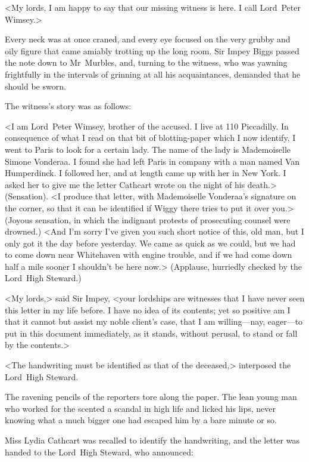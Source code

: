 <My lords, I am happy to say that our missing witness is here. I call Lord~Peter Wimsey.>

Every neck was at once craned, and every eye focused on the very grubby and oily figure that came amiably trotting up the long room. Sir Impey Biggs passed the note down to Mr~Murbles, and, turning to the witness, who was yawning frightfully in the intervals of grinning at all his acquaintances, demanded that he should be sworn.

The witness's story was as follows:

<I am Lord~Peter Wimsey, brother of the accused. I live at 110 Piccadilly. In consequence of what I read on that bit of blotting-paper which I now identify, I went to Paris to look for a certain lady. The name of the lady is Mademoiselle Simone Vonderaa. I found she had left Paris in company with a man named Van Humperdinck. I followed her, and at length came up with her in New York. I asked her to give me the letter Cathcart wrote on the night of his death.> (Sensation). <I produce that letter, with Mademoiselle Vonderaa's signature on the corner, so that it can be identified if Wiggy there tries to put it over you.> (Joyous sensation, in which the indignant protests of prosecuting counsel were drowned.) <And I'm sorry I've given you such short notice of this, old man, but I only got it the day before yesterday. We came as quick as we could, but we had to come down near Whitehaven with engine trouble, and if we had come down half a mile sooner I shouldn't be here now.> (Applause, hurriedly checked by the Lord~High Steward.)

<My lords,> said Sir Impey, <your lordships are witnesses that I have never seen this letter in my life before. I have no idea of its contents; yet so positive am I that it cannot but assist my noble client's case, that I am willing—nay, eager—to put in this document immediately, as it stands, without perusal, to stand or fall by the contents.>

<The handwriting must be identified as that of the deceased,> interposed the Lord~High Steward.

The ravening pencils of the reporters tore along the paper. The lean young man who worked for the  scented a scandal in high life and licked his lips, never knowing what a much bigger one had escaped him by a bare minute or so.

Miss Lydia Cathcart was recalled to identify the handwriting, and the letter was handed to the Lord~High Steward, who announced:

